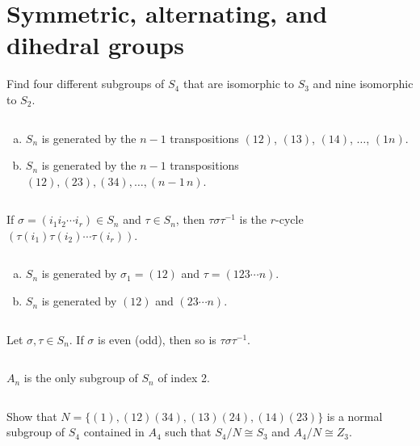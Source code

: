 \section{Symmetric, alternating, and dihedral groups}
\begin{ex}
    Find four different subgroups of $S_{4}$ that are isomorphic to $S_{3}$ and nine isomorphic to $S_{2}$.
\end{ex}

$$ $$

\begin{ex}
    \begin{enumerate}[(a)]
        \item $S_{n}$ is generated by the $n-1$ transpositions $(12)$, $(13)$, $(14)$, $\dots$, $(1n)$.
        \item $S_{n}$ is generated by the $n-1$ transpositions $(12), (23), (34),\dots, (n-1\, n)$.
    \end{enumerate}
\end{ex}

$$ $$

\begin{ex}
    If $\sigma=(i_{1}i_{2}\cdots i_{r})\in S_{n}$ and $\tau\in S_{n}$, then $\tau\sigma\tau^{-1}$ is the $r$-cycle $(\tau(i_{1})\tau(i_{2})\cdots\tau(i_{r}))$.
\end{ex}

$$ $$

\begin{ex}
    \begin{enumerate}[(a)]
    \item $S_{n}$  is generated by $\sigma_{1}=(12)$ and $\tau=(123\cdots n)$.
    \item $S_{n}$ is generated by $(12)$ and $(23\cdots n)$.
    \end{enumerate}
\end{ex}

$$ $$

\begin{ex}
    Let $\sigma, \tau \in S_{n}$. If $\sigma$ is even (odd), then so is $\tau\sigma\tau^{-1}$.
\end{ex}

$$ $$

\begin{ex}
    $A_{n}$ is the only subgroup of $S_{n}$ of index 2.
\end{ex}

$$ $$

\begin{ex}
    Show that $N=\{(1),(12)(34),(13)(24),(14)(23)\}$ is a normal subgroup of $S_{4}$ contained in $A_{4}$ such that $S_{4} /N\cong S_{3}$ and $A_{4} /N\cong Z_{3}$.
\end{ex}

